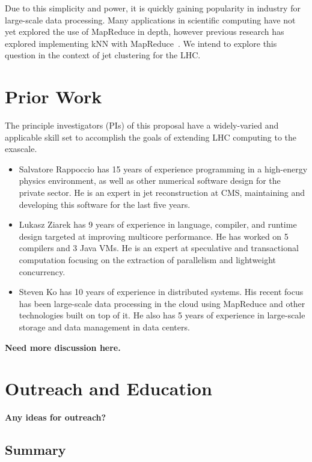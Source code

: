 \documentclass[12pt]{article}
\begin{document}
Due to this simplicity and power, it is quickly gaining popularity in industry
for large-scale data processing. Many applications in scientific computing have not
yet explored the use of MapReduce in depth, however
previous research has explored implementing kNN with
MapReduce~\cite{knn-mapreduce-0, knn-mapreduce-1}. We intend to explore this
question in the context of jet clustering for the LHC.



\section{Prior Work}

The principle investigators (PIs) of this proposal have a
widely-varied and applicable skill set to accomplish the goals of
extending LHC computing to the exascale. 

\begin{itemize}
\item Salvatore Rappoccio has 15 years of experience programming in a
  high-energy physics environment, as well as other numerical software
  design for the private sector. He is an expert in jet reconstruction
  at CMS, maintaining and developing this software for the last five
  years.
\item Lukasz Ziarek has 9 years of experience in language, compiler,
  and runtime design targeted at improving multicore performance.  He
  has worked on 5 compilers and 3 Java VMs. He is an expert at
  speculative and transactional computation focusing on the extraction
  of parallelism and lightweight concurrency. 
\item Steven Ko has 10 years of experience in distributed systems. His
  recent focus has been large-scale data processing in the cloud using
  MapReduce and other technologies built on top of it. He also has 5
  years of experience in large-scale storage and data management in
  data centers.
\end{itemize}

{\bf Need more discussion here.}


\section{Outreach and Education}

{\bf Any ideas for outreach?}

\subsection{Summary}
\end{document}
